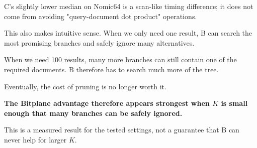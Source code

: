 C's slightly lower median on Nomic64 is a scan-like timing difference; it does not come from avoiding "query-document dot product" operations.

This also makes intuitive sense. When we only need one result, B can search the most promising branches and safely ignore many alternatives.

When we need 100 results, many more branches can still contain one of the required documents. B therefore has to search much more of the tree.

Eventually, the cost of pruning is no longer worth it.

\textbf{The Bitplane advantage therefore appears strongest when $K$ is small enough that many branches can be safely ignored.}

This is a measured result for the tested settings, not a guarantee that B can never help for larger $K$.






